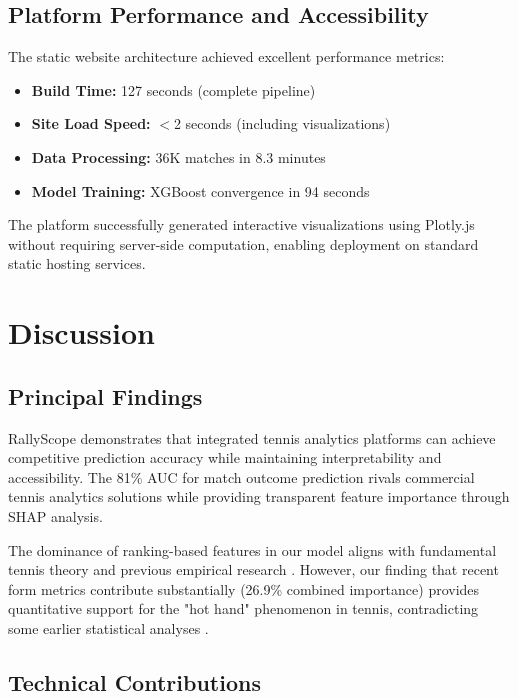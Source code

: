 \documentclass[11pt,a4paper]{article}
\begin{document}
\subsection{Platform Performance and Accessibility}

The static website architecture achieved excellent performance metrics:
\begin{itemize}
    \item \textbf{Build Time:} 127 seconds (complete pipeline)
    \item \textbf{Site Load Speed:} $<$2 seconds (including visualizations)
    \item \textbf{Data Processing:} 36K matches in 8.3 minutes
    \item \textbf{Model Training:} XGBoost convergence in 94 seconds
\end{itemize}

The platform successfully generated interactive visualizations using Plotly.js without requiring server-side computation, enabling deployment on standard static hosting services.

\section{Discussion}

\subsection{Principal Findings}

RallyScope demonstrates that integrated tennis analytics platforms can achieve competitive prediction accuracy while maintaining interpretability and accessibility. The 81\% AUC for match outcome prediction rivals commercial tennis analytics solutions \citep{cornman2017machine} while providing transparent feature importance through SHAP analysis.

The dominance of ranking-based features in our model aligns with fundamental tennis theory and previous empirical research \citep{kovalchik2018calibration,boulier2003predicting}. However, our finding that recent form metrics contribute substantially (26.9\% combined importance) provides quantitative support for the "hot hand" phenomenon in tennis, contradicting some earlier statistical analyses \citep{gilovich1985hot}.

\subsection{Technical Contributions}
\end{document}
